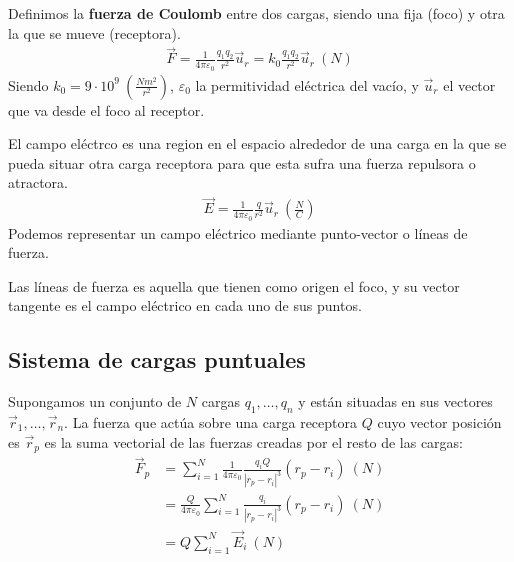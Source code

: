 \documentclass{../FisicaII.tex}
\begin{document}
\begin{defin}
	Definimos la \textbf{fuerza de Coulomb} entre dos cargas, siendo una fija
	(foco) y otra la que se mueve (receptora).
	\begin{equation}
		\begin{split}
			\vec{F} = \frac{1}{4\pi \varepsilon_{0}} \frac{q_1q_2}{r^{2}}\vec{u}_{r}
			= k_{0} \frac{q_1q_2}{r^{2}}\vec{u}_{r}~(N)
		\end{split}
	\end{equation}
	Siendo $k_{0} = 9 \cdot 10^{9}~( \frac{Nm^{2}}{r^{2}})$, $\varepsilon_{0}$
	la permitividad eléctrica del vacío, y $\vec{u}_{r}$ el vector que va desde
	el foco al receptor.
\end{defin}
\begin{defin}
	El campo eléctrco es una region en el espacio alrededor de una carga en la que
	se pueda situar otra carga receptora para que esta sufra una fuerza
	repulsora o atractora.
	\begin{equation}
		\begin{split}
			\vec{E} = \frac{1}{4\pi \varepsilon_{0}} \frac{q}{r^{2}}\vec{u}_{r}
			~\left(\frac{N}{C}\right)
		\end{split}
	\end{equation}
	Podemos representar un campo eléctrico mediante punto-vector o líneas de
	fuerza.
\end{defin}
\begin{defin}
	Las líneas de fuerza es aquella que tienen como origen el foco, y su vector
	tangente es el campo eléctrico en cada uno de sus puntos.
\end{defin}
\subsection{Sistema de cargas puntuales}
Supongamos un conjunto de $N$  cargas $q_{1},\dots ,q_{n}$ y están situadas en
sus vectores $\vec{r}_{1},\dots ,\vec{r}_{n}$. La fuerza que actúa sobre una
carga receptora $Q$ cuyo vector posición es $\vec{r}_{p}$ es la suma vectorial
de las fuerzas creadas por el resto de las cargas:
\begin{equation}
	\begin{split}
		\vec{F}_{p} &= \sum_{i=1}^{N} \frac{1}{4\pi\varepsilon_{0}}
		\frac{q_{i}Q}{|r_{p}-r_{i}|^{3}}(r_{p}-r_{i}) ~(N)\\
					&= \frac{Q}{4\pi\varepsilon_{0}}\sum_{i=1}^{N}
					\frac{q_{i}}{|r_{p}-r_{i}|^{3}}(r_{p}-r_{i})~(N)\\
					&= Q \sum_{i=1}^{N} \vec{E}_{i}~(N)
	\end{split}
\end{equation}
\end{document}
